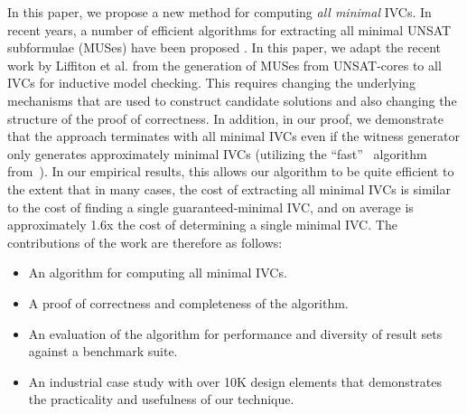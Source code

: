 

In this paper, we propose a new method for computing \emph{all minimal} IVCs. In  recent  years,  a  number  of  efficient
algorithms  for  extracting  all minimal UNSAT subformulae (MUSes)  have  been proposed \cite{bacchus2015using, belov2012muser2, belov2013core, belov2012towards, nadel2014accelerated, liffiton2005max}.  In this paper, we adapt the recent work by Liffiton et al. \cite{marco2016fast} from the generation of MUSes from UNSAT-cores to all IVCs for inductive model checking.  This requires changing the underlying mechanisms that are used to construct candidate solutions and also changing the structure of the proof of correctness.  In addition, in our proof, we demonstrate that the approach terminates with all minimal IVCs even if the witness generator only generates approximately minimal IVCs (utilizing the ``fast'' \ucalg\ algorithm from~\cite{Ghass16}).  In our empirical results, this allows our algorithm to be quite efficient to the extent that in many cases, the cost of extracting all minimal IVCs is similar to the cost of finding a single guaranteed-minimal IVC, and on average is approximately 1.6x the cost of determining a single minimal IVC.
The contributions of the work are therefore as follows:
\begin{itemize}
    \item An algorithm for computing all minimal IVCs.
    \item A proof of correctness and completeness of the algorithm.
    \item An evaluation of the algorithm for performance and diversity of result sets against a benchmark suite.
    \item An industrial case study with over 10K design elements that demonstrates the practicality and usefulness of our technique.
\end{itemize}

